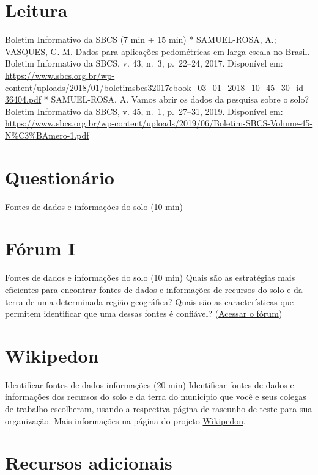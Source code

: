 \documentclass[
  11pt,
  a4paper,
  dvipsnames]{tufte-book}
\begin{document}
\hypertarget{leitura-1}{%
\section{Leitura}\label{leitura-1}}

Boletim Informativo da SBCS (7 min + 15 min)
* SAMUEL-ROSA, A.; VASQUES, G. M. Dados para aplicações pedométricas em larga escala no Brasil. Boletim Informativo da SBCS, v. 43, n.~3, p.~22--24, 2017. Disponível em: \url{https://www.sbcs.org.br/wp-content/uploads/2018/01/boletimsbcs32017ebook_03_01_2018_10_45_30_id_36404.pdf}
* SAMUEL-ROSA, A. Vamos abrir os dados da pesquisa sobre o solo? Boletim Informativo da SBCS, v. 45, n.~1, p.~27--31, 2019. Disponível em: \url{https://www.sbcs.org.br/wp-content/uploads/2019/06/Boletim-SBCS-Volume-45-N\%C3\%BAmero-1.pdf}

\hypertarget{questionuxe1rio-2}{%
\section{Questionário}\label{questionuxe1rio-2}}

Fontes de dados e informações do solo (10 min)

\hypertarget{fuxf3rum-i-1}{%
\section{Fórum I}\label{fuxf3rum-i-1}}

Fontes de dados e informações do solo (10 min)
Quais são as estratégias mais eficientes para encontrar fontes de dados e informações de recursos do solo e da terra de uma determinada região geográfica? Quais são as características que permitem identificar que uma dessas fontes é confiável? (\href{https://moodle.utfpr.edu.br/mod/forum/view.php?id=549655}{Acessar o fórum})

\hypertarget{wikipedon-1}{%
\section{Wikipedon}\label{wikipedon-1}}

Identificar fontes de dados informações (20 min)
Identificar fontes de dados e informações dos recursos do solo e da terra do município que você e seus colegas de trabalho escolheram, usando a respectiva página de rascunho de teste para sua organização. Mais informações na página do projeto \href{https://pt.wikiversity.org/wiki/Wikipedon}{Wikipedon}.

\hypertarget{recursos-adicionais}{%
\section{Recursos adicionais}\label{recursos-adicionais}}
\end{document}
